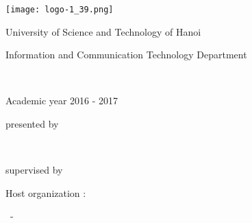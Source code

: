 \newpage
\empty
\thispagestyle{empty}

\begin{center}






\texttt{[image: logo-1\_39.png]}


\vspace*{1cm} 



{\huge University of Science and Technology of Hanoi }\\


\vspace*{1cm} 


{\large Information and Communication Technology Department}\\


\vspace*{1cm} 



{\huge \MasterLevel }\\


\vspace*{1cm} 

{\large Academic year 2016 -  2017}


\vfill


\noindent\hrulefill

\vspace*{2mm} 

{\Large \InternshipTitle }


\noindent\hrulefill





\vfill 



{\large presented by } \\

\vspace*{5mm} 


{\large \bf \FirstName~  \LastName} \\


\vspace*{5mm} 








{\large supervised by  \Supervisor } \\


\vspace*{20mm} 




{\large Host organization :   \HostOrganization }


\vspace*{5mm} 


{\large  \CityName~- \CountryName} \\

\vspace*{5mm} 







\end{center}
